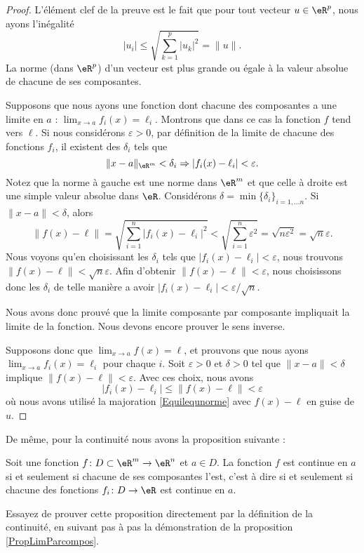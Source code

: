 \begin{proof}
	L'élément clef de la preuve est le fait que pour tout vecteur $u\in\eR^p$, nous ayons l'inégalité
	\begin{equation}	\label{Equilequnorme}
		| u_i |\leq\sqrt{\sum_{k=1}^p| u_k |^2}=\| u \|.
	\end{equation}
	La norme (dans $\eR^p$) d'un vecteur est plus grande ou égale à la valeur absolue de chacune de ses composantes.

	Supposons que nous ayons une fonction dont chacune des composantes a une limite en $a$ : $\lim_{x\to a} f_i(x)=\ell_i$. Montrons que dans ce cas la fonction $f$ tend vers $\ell$. Si nous considérons $\varepsilon>0$, par définition de la limite de chacune des fonctions $f_i$, il  existent des $\delta_i$ tels que
	\begin{equation}
		\| x-a \|_{\eR^m}<\delta_i\Rightarrow | f_i(x)-\ell_i |<\varepsilon.
	\end{equation}
	Notez que la norme à gauche est une norme dans $\eR^m$ et que celle à droite est une simple valeur absolue dans $\eR$. Considérons $\delta=\min\{ \delta_i \}_{i=1,\ldots n}$. Si $\| x-a \|<\delta$, alors
	\begin{equation}
		\| f(x)-\ell \|=\sqrt{\sum_{i=1}^n| f_i(x)-\ell_i |^2}<\sqrt{\sum_{i=1}^n\varepsilon^2}=\sqrt{n\varepsilon^2}=\sqrt{n}\varepsilon.
	\end{equation}
	Nous voyons qu'en choisissant les $\delta_i$ tels que $| f_i(x)-\ell_i |<\varepsilon$, nous trouvons $\| f(x)-\ell \|<\sqrt{n}\varepsilon$. Afin d'obtenir $\| f(x)-\ell \|<\varepsilon$, nous choisissons donc les $\delta_i$ de telle manière a avoir $| f_i(x)-\ell_i |<\varepsilon/\sqrt{n}$.

	Nous avons donc prouvé que la limite composante par composante impliquait la limite de la fonction. Nous devons encore prouver le sens inverse.

	Supposons donc que $\lim_{x\to a} f(x)=\ell$, et prouvons que nous ayons $\lim_{x\to a} f_i(x)=\ell_i$ pour chaque $i$. Soit $\varepsilon>0$ et $\delta>0$ tel que $\| x-a \|<\delta$ implique $\| f(x)-\ell \|<\varepsilon$. Avec ces choix, nous avons
	\begin{equation}
		| f_i(x)-\ell_i |\leq\| f(x)-\ell \|<\varepsilon
	\end{equation}
	où nous avons utilisé la majoration \eqref{Equilequnorme} avec $f(x)-\ell$ en guise de $u$.
\end{proof}

De même, pour la continuité nous avons la proposition suivante :
\begin{proposition}
	Soit une fonction $f\colon D\subset\eR^m\to \eR^n$ et $a\in D$. La fonction $f$ est continue en $a$ si et seulement si chacune de ses composantes l'est, c'est à dire si et seulement si chacune des fonctions $f_i\colon D\to \eR$ est continue en $a$.
\end{proposition}
Essayez de prouver cette proposition directement par la définition de la continuité, en suivant pas à pas la démonstration de la proposition \ref{PropLimParcompos}.

